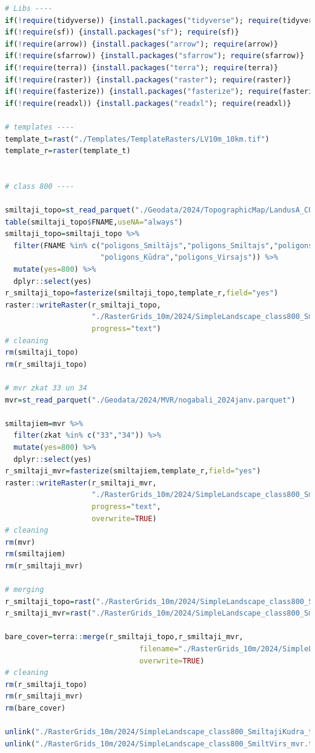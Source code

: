 \documentclass[
]{book}
\begin{document}
\begin{lstlisting}[language=R]
# Libs ----
if(!require(tidyverse)) {install.packages("tidyverse"); require(tidyverse)}
if(!require(sf)) {install.packages("sf"); require(sf)}
if(!require(arrow)) {install.packages("arrow"); require(arrow)}
if(!require(sfarrow)) {install.packages("sfarrow"); require(sfarrow)}
if(!require(terra)) {install.packages("terra"); require(terra)}
if(!require(raster)) {install.packages("raster"); require(raster)}
if(!require(fasterize)) {install.packages("fasterize"); require(fasterize)}
if(!require(readxl)) {install.packages("readxl"); require(readxl)}

# templates ----
template_t=rast("./Templates/TemplateRasters/LV10m_10km.tif")
template_r=raster(template_t)


# class 800 ----

smiltaji_topo=st_read_parquet("./Geodata/2024/TopographicMap/LandusA_COMB.parquet")
table(smiltaji_topo$FNAME,useNA="always")
smiltaji_topo=smiltaji_topo %>% 
  filter(FNAME %in% c("poligons_Smiltājs","poligons_Smiltajs","poligons_Grants",
                      "poligons_Kūdra","poligons_Virsajs")) %>% 
  mutate(yes=800) %>% 
  dplyr::select(yes)
r_smiltaji_topo=fasterize(smiltaji_topo,template_r,field="yes")
raster::writeRaster(r_smiltaji_topo,
                    "./RasterGrids_10m/2024/SimpleLandscape_class800_SmiltajiKudra_topo.tif",
                    progress="text")
# cleaning
rm(smiltaji_topo)
rm(r_smiltaji_topo)

# mvr zkat 33 un 34
mvr=st_read_parquet("./Geodata/2024/MVR/nogabali_2024janv.parquet")

smiltajiem=mvr %>% 
  filter(zkat %in% c("33","34")) %>% 
  mutate(yes=800) %>% 
  dplyr::select(yes)
r_smiltaji_mvr=fasterize(smiltajiem,template_r,field="yes")
raster::writeRaster(r_smiltaji_mvr,
                    "./RasterGrids_10m/2024/SimpleLandscape_class800_SmiltVirs_mvr.tif",
                    progress="text",
                    overwrite=TRUE)
# cleaning
rm(mvr)
rm(smiltajiem)
rm(r_smiltaji_mvr)

# merging
r_smiltaji_topo=rast("./RasterGrids_10m/2024/SimpleLandscape_class800_SmiltajiKudra_topo.tif")
r_smiltaji_mvr=rast("./RasterGrids_10m/2024/SimpleLandscape_class800_SmiltVirs_mvr.tif")

bare_cover=terra::merge(r_smiltaji_topo,r_smiltaji_mvr,
                               filename="./RasterGrids_10m/2024/SimpleLandscape_class800_smiltaji_premask.tif",
                               overwrite=TRUE)
# cleaning
rm(r_smiltaji_topo)
rm(r_smiltaji_mvr)
rm(bare_cover)

unlink("./RasterGrids_10m/2024/SimpleLandscape_class800_SmiltajiKudra_topo.tif")
unlink("./RasterGrids_10m/2024/SimpleLandscape_class800_SmiltVirs_mvr.tif")
\end{lstlisting}
\end{document}
